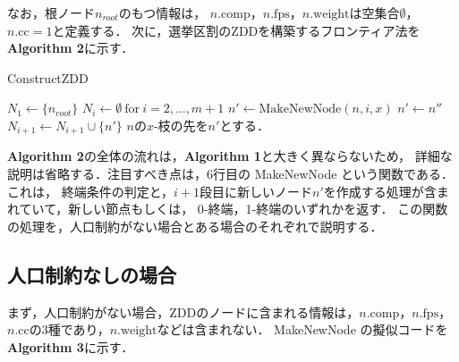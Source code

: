 なお，根ノード$n_{root}$のもつ情報は，
$n.\mathrm{comp}$，$n.\mathrm{fps}，n.\mathrm{weight}$は空集合$\emptyset$，
$n.\mathrm{cc}=1$と定義する．
次に，選挙区割のZDDを構築するフロンティア法を\textbf{Algorithm 2}に示す．

\begin{algorithm}
  \caption{ConstructZDD}
  \label{construct_zdd}
  \begin{algorithmic}[1]
    \State $N_1 \gets \{n_{root}\}$
    \State $N_i \gets \emptyset~\mathrm{for}~i=2, \ldots ,m+1$
          \State $n' \gets \mathrm{MakeNewNode}(n,i,x)$
              \State $n' \gets n''$
            \Else
              \State $N_{i+1} \gets N_{i+1} \cup \{n'\}$
            \EndIf
          \EndIf
          \State $n$の$x$-枝の先を$n'$とする．
        \EndFor
      \EndFor
    \EndFor
  \end{algorithmic}
\end{algorithm}

\textbf{Algorithm 2}の全体の流れは，\textbf{Algorithm 1}と大きく異ならないため，
詳細な説明は省略する．注目すべき点は，6行目の MakeNewNode という関数である．これは，
終端条件の判定と，$i+1$段目に新しいノード$n'$を作成する処理が含まれていて，新しい節点もしくは，
0-終端，1-終端のいずれかを返す．
この関数の処理を，人口制約がない場合とある場合のそれぞれで説明する．

\subsection{人口制約なしの場合}

まず，人口制約がない場合，ZDDのノードに含まれる情報は，$n.\mathrm{comp}$，$n.\mathrm{fps}$，
$n.\mathrm{cc}$の3種であり，$n.\mathrm{weight}$などは含まれない．
MakeNewNode の擬似コードを\textbf{Algorithm 3}に示す．

